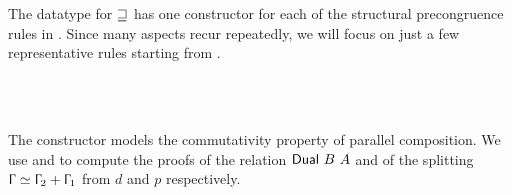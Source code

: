 \begin{AgdaAlign}
\begin{code}%
\>[0]\AgdaSpace{}%
\AgdaSpace{}%
\AgdaSymbol{:}\AgdaSpace{}%
\AgdaSymbol{\}}\AgdaSpace{}%
\AgdaSpace{}%
\AgdaSpace{}%
\AgdaSpace{}%
\AgdaSpace{}%
\AgdaSpace{}%
\AgdaSpace{}%
\AgdaSpace{}%
\AgdaSpace{}%
\<%
\end{code}

The datatype for $\sqsupseteq$ has one constructor for each of the structural
precongruence rules in . Since many aspects recur
repeatedly, we will focus on just a few representative rules starting from
\SComm.

\begin{code}%
\>[0][@{}l@{\AgdaIndent{1}}]%
\>[2]\AgdaSpace{}%
\AgdaSymbol{:}\<%
\\
\>[2][@{}l@{\AgdaIndent{0}}]%
\>[4]\AgdaSpace{}%
\AgdaSpace{}%
\AgdaSpace{}%
\AgdaSpace{}%
\AgdaSpace{}%
\AgdaSpace{}%
\AgdaSymbol{\}}\AgdaSpace{}%
\AgdaSymbol{(}\AgdaSpace{}%
\AgdaSymbol{:}\AgdaSpace{}%
\AgdaSpace{}%
\AgdaSpace{}%
\AgdaSymbol{)}\AgdaSpace{}%
\AgdaSymbol{(}\AgdaSpace{}%
\AgdaSymbol{:}\AgdaSpace{}%
\AgdaSpace{}%
\AgdaSpace{}%
\AgdaSpace{}%
\AgdaOperator{\AgdaDatatype{+}}\AgdaSpace{}%
\AgdaSymbol{)}\AgdaSpace{}%
\<%
\\
%
\>[4]\AgdaSpace{}%
\AgdaSpace{}%
\AgdaSpace{}%
\AgdaSpace{}%
\AgdaSpace{}%
\AgdaSpace{}%
\AgdaSpace{}%
\AgdaSymbol{(}\AgdaSpace{}%
\AgdaSymbol{)}\AgdaSpace{}%
\AgdaSymbol{(}\AgdaSpace{}%
\AgdaSymbol{)}\AgdaSpace{}%
\AgdaSpace{}%
\<%
\end{code}

The constructor  models the commutativity
property of parallel composition. We use  and
 to compute the proofs of the relation
$\AgdaDatatype{Dual}~B~A$ and of the splitting $\Upgamma \simeq \Upgamma_2 +
\Upgamma_1$ from $d$ and $p$ respectively.


\end{AgdaAlign}

